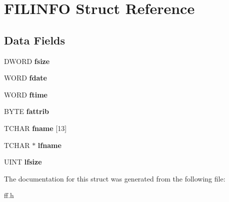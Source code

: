 \hypertarget{struct_f_i_l_i_n_f_o}{}\section{F\+I\+L\+I\+N\+FO Struct Reference}
\label{struct_f_i_l_i_n_f_o}
\subsection*{Data Fields}
\begin{DoxyCompactItemize}
\item 
\mbox{\label{struct_f_i_l_i_n_f_o_aee7441af7dc0c443d1e1e6011cc7dcac}} 
D\+W\+O\+RD {\bfseries fsize}
\item 
\mbox{\label{struct_f_i_l_i_n_f_o_a7c01c48a15b1b49da459924437b0bd52}} 
W\+O\+RD {\bfseries fdate}
\item 
\mbox{\label{struct_f_i_l_i_n_f_o_ae0f751b79621bf7b29669f177bbe6b9a}} 
W\+O\+RD {\bfseries ftime}
\item 
\mbox{\label{struct_f_i_l_i_n_f_o_a838d542585831b085537b363f18205c0}} 
B\+Y\+TE {\bfseries fattrib}
\item 
\mbox{\label{struct_f_i_l_i_n_f_o_abd852510f2f79b4ec773156d8942dc7c}} 
T\+C\+H\+AR {\bfseries fname} \mbox{[}13\mbox{]}
\item 
\mbox{\label{struct_f_i_l_i_n_f_o_ac4506c29e0219130dff46b01a1b5c023}} 
T\+C\+H\+AR $\ast$ {\bfseries lfname}
\item 
\mbox{\label{struct_f_i_l_i_n_f_o_a2527c511ff4d12d285dbf3c4b3c9fb7b}} 
U\+I\+NT {\bfseries lfsize}
\end{DoxyCompactItemize}


The documentation for this struct was generated from the following file\+:\begin{DoxyCompactItemize}
\item 
ff.\+h\end{DoxyCompactItemize}
